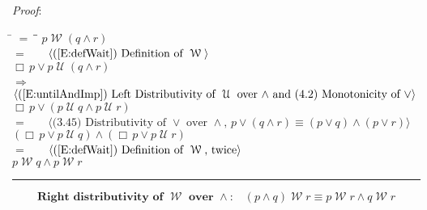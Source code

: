 \documentclass[12pt, fleqn, leqno]{article}
\newcommand{\lgap}{2pt}                             %
\newcommand{\mymathindent}{24pt}                    %
\newcommand{\impl}{\ensuremath{\Rightarrow}}        %
\newcommand{\Until}{\;\mathcal{U}\;}
\newcommand{\Wait}{\;\mathcal{W}\;}
\newcommand{\Always}{\Box\,}
\newcommand{\myqed}{\rule[-.23ex]{1.2ex}{2.0ex}}
\newcommand{\myqedtab}{\hspace{384pt}}              %
\newcommand{\Gll} {\langle}                         %
\newcommand{\Ggg} {\rangle}                         %
\newcommand{\Hint}[1]     {\ \ \ $\Gll              \mbox{#1} \Ggg$ }   %
\begin{document}
\emph{Proof}:
\begin{tabbing}
\hspace{\mymathindent} \= $= \;$ \= \myqedtab \= \kill
\> \> $p \Wait (q \land r)$\\[\lgap]
\> $=$ \> \Hint{(\ref{E:defWait}) Definition of $\Wait$} \\[\lgap]
\> \> $\Always p\lor p \Until (q \land r)$\\[\lgap]
\> $\impl$ \> \Hint{(\ref{E:untilAndImp}) Left Distributivity of $\Until$ over $\land$ and (4.2) Monotonicity of $\lor$} \\[\lgap]
\> \> $\Always p\lor (p \Until q \land p \Until r)$\\[\lgap]
\> $=$ \> \Hint{(3.45) Distributivity of $\lor$ over $\land$, $p\lor (q\land r) \equiv (p\lor q) \land (p\lor r)$} \\[\lgap]
\> \> $(\Always p\lor p \Until q) \land (\Always p\lor p \Until r)$\\[\lgap]
\> $=$ \> \Hint{(\ref{E:defWait}) Definition of $\Wait$, twice} \\[\lgap]
\> \> $p \Wait q \land p \Wait r$ \quad \myqed
\end{tabbing}
\begin{equation}\label{E:rightWaitAndDist}
\textbf{Right distributivity of $\Wait$ over $\land$:}\quad (p \land q) \Wait r\equiv p \Wait r \land q \Wait r
\end{equation}
\end{document}
